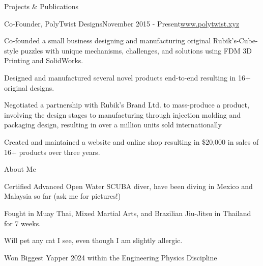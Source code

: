 \documentclass{resume} %
\newenvironment{CVmode}{}{}
\begin{document}
\begin{rSection}{Projects \& Publications}
\begin{CVmode}

\begin{rSubsection}{Co-Founder, PolyTwist Designs}{November 2015 - Present}{\url{www.polytwist.xyz}}{}
\item Co-founded a small business designing and manufacturing original Rubik's-Cube-style puzzles with unique mechanisms, challenges, and solutions using FDM 3D Printing and SolidWorks.
\item Designed and manufactured several novel products end-to-end resulting in 16+ original designs.
\item Negotiated a partnership with Rubik's Brand Ltd. to mass-produce a product, involving the design stages to manufacturing through injection molding and packaging design, resulting in over a million units sold internationally
\item Created and maintained a website and online shop resulting in \$20,000 in sales of 16+ products over three years.
\end{rSubsection}

\end{CVmode}

\end{rSection}

\begin{CVmode}
\begin{comment}
\begin{rSection}{Relevant Coursework}
\begin{tabular}{ @{} >{\bfseries}l @{\hspace{6ex}} l }
Experimental Physics & DAQ with LabVIEW, Electronics, 

\end{tabular}
\end{rSection}
\end{comment}
\end{CVmode}

\begin{rSection}{About Me}
\begin{rSubsection}{}{}{}{}{}
\item Certified Advanced Open Water SCUBA diver, have been diving in Mexico and Malaysia so far (ask me for pictures!)
\item Fought in Muay Thai, Mixed Martial Arts, and Brazilian Jiu-Jitsu in Thailand for 7 weeks.
\item Will pet any cat I see, even though I am slightly allergic.
\item Won Biggest Yapper 2024 within the Engineering Physics Discipline
\end{rSubsection}
\end{rSection}
\end{document}
